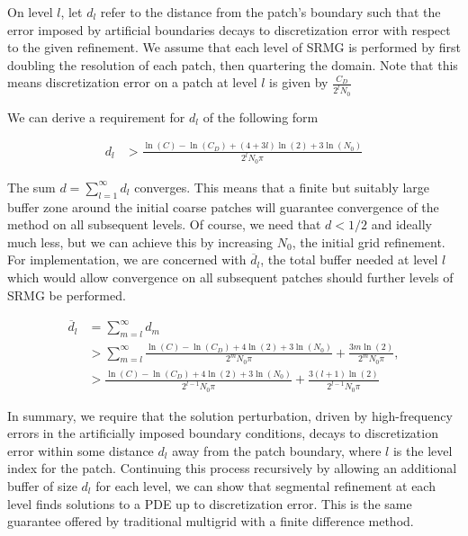 \documentclass[final]{siamart1116}
\numberwithin{theorem}{section}
\begin{document}
On level $l$, let $d_l$ refer to the distance from the patch's boundary such that the error imposed by artificial boundaries decays to discretization error with respect to the given refinement. We assume that each level of SRMG is performed by first doubling the resolution of each patch, then quartering the domain. Note that this means discretization error on a patch at level $l$ is given by $\frac{C_D}{2^l N_0}$

We can derive a requirement for $d_l$ of the following form




\begin{align}
  d_l &> \frac{\ln(C) - \ln(C_D) + (4+3l) \ln(2) + 3 \ln(N_0)}{2^l N_0 \pi} \label{singlebuffer}
\end{align}

The sum $d = \sum^\infty_{l=1} d_l$ converges. This means that a finite but suitably large buffer zone around the initial coarse patches will guarantee convergence of the method on all subsequent levels. Of course, we need that $d < 1/2$ and ideally much less, but we can achieve this by increasing $N_0$, the initial grid refinement. 
For implementation, we are concerned with $\overline d_l$, the total buffer needed at level $l$ which would allow convergence on all subsequent patches should further levels of SRMG be performed. 


\begin{align}
  \overline d_l &= \sum^\infty_{m=l} d_m \nonumber \\
 &> \sum^\infty_{m=l} \frac{\ln(C) - \ln(C_D) + 4 \ln(2) + 3 \ln(N_0)}{2^m N_0 \pi} + \frac{3m \ln(2)}{2^m N_0 \pi}, \nonumber \\
 &> \frac{\ln(C) - \ln(C_D) + 4 \ln(2) + 3 \ln(N_0)}{2^{l-1} N_0 \pi} + \frac{3 (l+1) \ln(2)}{2^{l-1} N_0 \pi} \label{bufferreq}
 \end{align}


In summary, we require that the solution perturbation, driven by high-frequency errors in the artificially imposed boundary conditions, decays to discretization error within some distance $d_l$ away from the patch boundary, where $l$ is the level index for the patch. Continuing this process recursively  by allowing an additional buffer of size $d_l$ for each level, we can show that segmental refinement at each level finds solutions to a PDE up to discretization error. This is the same guarantee offered by traditional multigrid with a finite difference method. 
\end{document}
